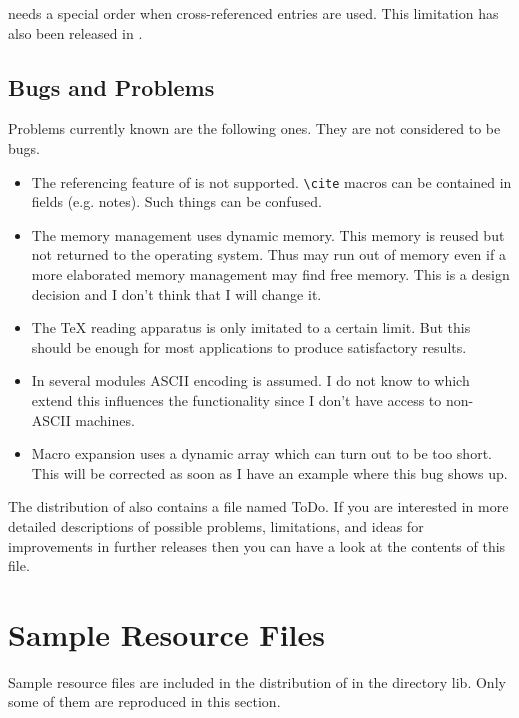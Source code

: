 \documentclass[11pt,a4paper]{scrbook}
\newcommand\file[1]{\textsf{#1}}
\begin{document}
\BibTeX{} needs a special order when cross-referenced entries are used. This
limitation has also been released in \BibTool.


\section{Bugs and Problems}

Problems currently known are the following ones. They are not considered to be
bugs.
\begin{itemize}
\item The referencing feature of \BibTeX{} is not supported. \verb|\cite|
  macros can be contained in fields (e.g. notes). Such things can be confused.
\item The memory management uses dynamic memory. This memory is reused but not
  returned to the operating system. Thus \BibTool{} may run out of memory even
  if a more elaborated memory management may find free memory. This is a
  design decision and I don't think that I will change it.
\item The \TeX{} reading apparatus is only imitated to a certain limit. But
  this should be enough for most applications to produce satisfactory results.
\item In several modules ASCII encoding is assumed. I do not know to which
  extend this influences the functionality since I don't have access to
  non-ASCII machines.
\item Macro expansion uses a dynamic array which can turn out to be too
  short. This will be corrected as soon as I have an example where this bug
  shows up. 
\end{itemize}

The distribution of \BibTool{} also contains a file named \file{ToDo}. If you
are interested in more detailed descriptions of possible problems,
limitations, and ideas for improvements in further releases then you can have
a look at the contents of this file.

\chapter{Sample Resource Files}\label{chap:resource.files}

Sample resource files are included in the distribution of \BibTool{} in the
directory \file{lib}. Only some of them are reproduced in this section.
\end{document}
